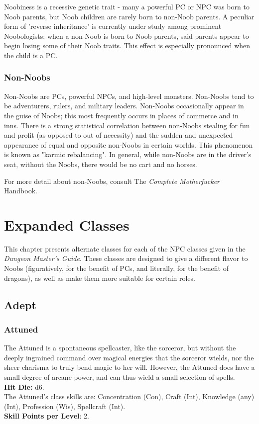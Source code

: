 \documentclass[11pt]{report}
\begin{document}
Noobiness is a recessive genetic trait - many a powerful PC or NPC was born to
Noob parents, but Noob children are rarely born to non-Noob parents. A peculiar
form of 'reverse inheritance' is currently under study among prominent
Noobologists: when a non-Noob is born to Noob parents, said parents appear to
begin losing some of their Noob traits. This effect is especially pronounced
when the child is a PC.

\subsection{Non-Noobs}
Non-Noobs are PCs, powerful NPCs, and high-level monsters. Non-Noobs tend to be
adventurers, rulers, and military leaders. Non-Noobs occasionally appear in the
guise of Noobs; this most frequently occurs in places of commerce and in inns.
There is a strong statistical correlation between non-Noobs stealing for fun and
profit (as opposed to out of necessity) and the sudden and unexpected appearance
of equal and opposite non-Noobs in certain worlds. This phenomenon is known as
"karmic rebalancing". In general, while non-Noobs are in the driver's seat,
without the Noobs, there would be no cart and no horses.

For more detail about non-Noobs, consult The \textit{Complete Motherfucker}
Handbook.

\chapter{Expanded Classes}
This chapter presents alternate classes for each of the NPC classes given in the
\textit{Dungeon Master's Guide}. These classes are designed to give a different
flavor to Noobs (figuratively, for the benefit of PCs, and literally, for the
benefit of dragons), as well as make them more suitable for certain roles.

\section{Adept}
\subsection{Attuned}
The Attuned is a spontaneous spellcaster, like the sorceror, but without the
deeply ingrained command over magical energies that the sorceror wields, nor the
sheer charisma to truly bend magic to her will. However, the Attuned does have
a small degree of arcane power, and can thus wield a small selection of spells.
\\
\textbf{Hit Die:} d6. \\
The Attuned's class skills are: Concentration (Con), Craft (Int), Knowledge
(any) (Int), Profession (Wis), Spellcraft (Int). \\
\textbf{Skill Points per Level}: 2.
\end{document}
